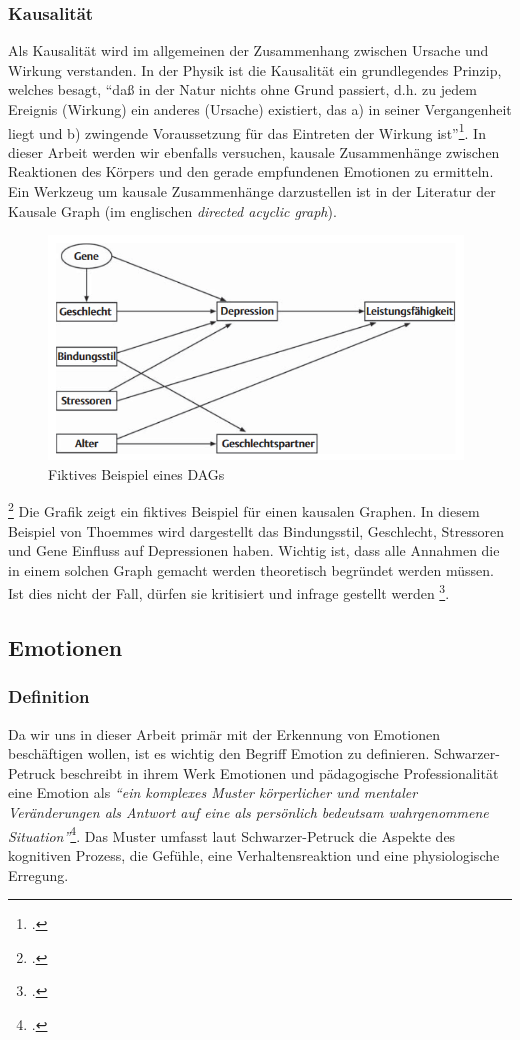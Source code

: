 \subsubsection{Kausalität}
Als Kausalität wird im allgemeinen der Zusammenhang zwischen Ursache und Wirkung verstanden. In der Physik ist die Kausalität ein grundlegendes Prinzip, welches besagt, ``daß in der Natur nichts ohne Grund passiert, d.h. zu jedem Ereignis (Wirkung) ein anderes (Ursache) existiert, das a) in seiner Vergangenheit liegt und b) zwingende Voraussetzung für das Eintreten der Wirkung ist''\footcite{Sav18}.\newline
In dieser Arbeit werden wir ebenfalls versuchen, kausale Zusammenhänge zwischen Reaktionen des Körpers und den gerade empfundenen Emotionen zu ermitteln.
Ein Werkzeug um kausale Zusammenhänge darzustellen ist in der Literatur der Kausale Graph (im englischen \textit{directed acyclic graph}).
\begin{figure}[h]
	\centering
	\includegraphics[width=11cm]{Bilder/dag.png}
	\caption[Fiktives Beispiel eines DAGs]{Fiktives Beispiel eines DAGs\footnotemark}
\end{figure}
\footcite[Vgl.][Kausale Graphen - DAGs]{Tho11}
Die Grafik zeigt ein fiktives Beispiel für einen kausalen Graphen. In diesem Beispiel von Thoemmes wird dargestellt das Bindungsstil, Geschlecht, Stressoren und Gene Einfluss auf Depressionen haben. Wichtig ist, dass alle Annahmen die in einem solchen Graph gemacht werden theoretisch begründet werden müssen. Ist dies nicht der Fall, dürfen sie kritisiert und infrage gestellt werden \footcite[Vgl. ][S.3 Kausale Graphen - DAGs]{Tho11}.
\subsection{Emotionen}
\subsubsection{Definition}
Da wir uns in dieser Arbeit primär mit der Erkennung von Emotionen beschäftigen wollen, ist es wichtig den Begriff Emotion zu definieren.
Schwarzer-Petruck beschreibt in ihrem Werk Emotionen und pädagogische Professionalität eine Emotion als \textit{``ein komplexes
	Muster körperlicher und mentaler Veränderungen als Antwort auf eine als persönlich bedeutsam wahrgenommene Situation''}\footcite[S.51 Z.20ff]{Sch13}.
Das Muster umfasst laut Schwarzer-Petruck die Aspekte des kognitiven Prozess, die Gefühle, eine Verhaltensreaktion und eine physiologische Erregung.
